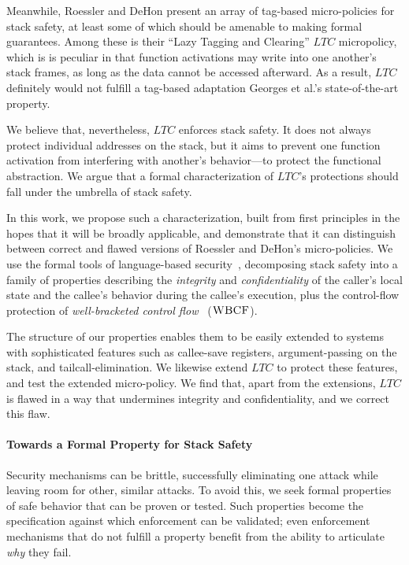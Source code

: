 \documentclass[10pt,conference]{ieeetran}%
\theoremstyle{definition}
\begin{document}
Meanwhile, Roessler and DeHon \cite{DBLP:conf/sp/RoesslerD18} present an array of tag-based
micro-policies for stack safety, at least some of which should be amenable to making
formal guarantees. Among these is their ``Lazy Tagging and Clearing'' \(LTC\) micropolicy,
which is is peculiar in that function activations may write into one another's stack frames,
as long as the data cannot be accessed afterward. As a result, \(LTC\) definitely would not
fulfill a tag-based adaptation Georges et al.'s state-of-the-art property.

We believe that, nevertheless, \(LTC\) enforces stack safety.
It does not always protect individual addresses on the stack, but it aims
to prevent one function activation from interfering with another's behavior---to protect
the functional abstraction. We argue that a formal characterization of \(LTC\)'s protections
should fall under the umbrella of stack safety.

In this work, we propose such a characterization, built from first principles
in the hopes that it will be broadly applicable, and demonstrate
that it can distinguish between correct and flawed versions of Roessler and DeHon's
micro-policies. We use the formal tools of language-based
security~\cite{sabelfeld2003language}, decomposing stack safety into a family of
properties describing
the {\em integrity} and {\em confidentiality} of the caller’s local state
and the callee's behavior during the callee's execution, plus the control-flow protection
of {\em well-bracketed control flow}~\cite{SkorstengaardSTKJFP} (\(\textnormal{\sc WBCF}\)).

The structure of our properties enables them to be easily extended to systems with
sophisticated features such as callee-save registers, argument-passing on the stack,
and tailcall-elimination. We likewise extend \(LTC\) to protect these features, and
test the extended micro-policy. We find that, apart from the extensions, \(LTC\)
is flawed in a way that undermines integrity and confidentiality, and we correct
this flaw.

\paragraph{Towards a Formal Property for Stack Safety}

Security mechanisms can be brittle, successfully eliminating one attack while leaving room for
other, similar attacks. To avoid this, we seek formal properties of safe behavior that can be proven
or tested. Such properties become the specification against which enforcement can be validated;
even enforcement mechanisms that do not fulfill a property benefit from the ability to articulate
\emph{why} they fail.
\end{document}
